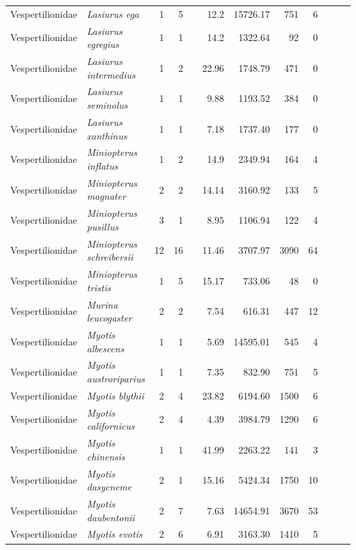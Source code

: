 \begin{landscape}
\begin{longtable}{@{}llrrrrrrrrrl@{}}
  Vespertilionidae & \emph{Lasiurus ega} & 1 & 5 &  & 12.2 & 15726.17 & 751 & 6 &  &  &  \\ 
  Vespertilionidae & \emph{Lasiurus egregius} & 1 & 1 &  & 14.2 & 1322.64 & 92 & 0 &  &  &  \\ 
  Vespertilionidae & \emph{Lasiurus intermedius} & 1 & 2 &  & 22.96 & 1748.79 & 471 & 0 &  &  &  \\ 
  Vespertilionidae & \emph{Lasiurus seminolus} & 1 & 1 &  & 9.88 & 1193.52 & 384 & 0 &  &  &  \\ 
  Vespertilionidae & \emph{Lasiurus xanthinus} & 1 & 1 &  & 7.18 & 1737.40 & 177 & 0 &  &  &  \\ 
  Vespertilionidae & \emph{Miniopterus inflatus} & 1 & 2 &  & 14.9 & 2349.94 & 164 & 4 &  &  &  \\ 
  Vespertilionidae & \emph{Miniopterus magnater} & 2 & 2 &  & 14.14 & 3160.92 & 133 & 5 &  &  &  \\ 
  Vespertilionidae & \emph{Miniopterus pusillus} & 3 & 1 &  & 8.95 & 1106.94 & 122 & 4 &  &  &  \\ 
  Vespertilionidae & \emph{Miniopterus schreibersii} & 12 & 16 &  & 11.46 & 3707.97 & 3090 & 64 &  &  &  \\ 
  Vespertilionidae & \emph{Miniopterus tristis} & 1 & 5 &  & 15.17 & 733.06 & 48 & 0 &  &  &  \\ 
  Vespertilionidae & \emph{Murina leucogaster} & 2 & 2 &  & 7.54 & 616.31 & 447 & 12 &  &  &  \\ 
  Vespertilionidae & \emph{Myotis albescens} & 1 & 1 &  & 5.69 & 14595.01 & 545 & 4 &  &  &  \\ 
  Vespertilionidae & \emph{Myotis austroriparius} & 1 & 1 &  & 7.35 & 832.90 & 751 & 5 &  &  &  \\ 
  Vespertilionidae & \emph{Myotis blythii} & 2 & 4 &  & 23.82 & 6194.60 & 1500 & 6 &  &  &  \\ 
  Vespertilionidae & \emph{Myotis californicus} & 2 & 4 &  & 4.39 & 3984.79 & 1290 & 6 &  &  &  \\ 
  Vespertilionidae & \emph{Myotis chinensis} & 1 & 1 &  & 41.99 & 2263.22 & 141 & 3 &  &  &  \\ 
  Vespertilionidae & \emph{Myotis dasycneme} & 2 & 1 &  & 15.16 & 5424.34 & 1750 & 10 &  &  &  \\ 
  Vespertilionidae & \emph{Myotis daubentonii} & 2 & 7 &  & 7.63 & 14654.91 & 3670 & 53 &  &  &  \\ 
  Vespertilionidae & \emph{Myotis evotis} & 2 & 6 &  & 6.91 & 3163.30 & 1410 & 5 &  &  &  \\ 

\end{longtable}
\end{landscape}
